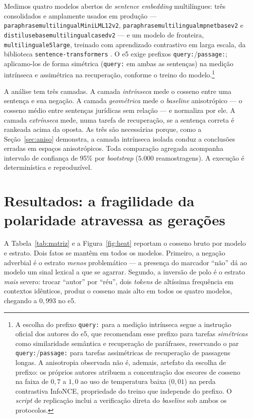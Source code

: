 \documentclass[11pt]{article}
\begin{document}
Medimos quatro modelos abertos de \textit{sentence embedding} multilíngues:
três consolidados e amplamente usados em produção --- \texttt{paraphrase\-multilingual\-MiniLM\-L12\-v2}, \texttt{paraphrase\-multilingual\-mpnet\-base\-v2} e
\texttt{distiluse\-base\-multilingual\-cased\-v2} --- e um modelo de fronteira,
\texttt{multilingual\-e5\-large}, treinado com aprendizado contrastivo em larga
escala, da biblioteca \texttt{sentence-transformers} \cite{reimers2019}. O e5
exige prefixos \texttt{query:}/\texttt{passage:}; aplicamo-los de forma simétrica
(\texttt{query:} em ambas as sentenças) na medição intrínseca e assimétrica na
recuperação, conforme o treino do modelo.\footnote{A escolha do prefixo
\texttt{query:} para a medição intrínseca segue a instrução oficial dos autores do
e5, que recomendam esse prefixo para tarefas \emph{simétricas} como similaridade
semântica e recuperação de paráfrases, reservando o par \texttt{query:}/\texttt{passage:}
para tarefas assimétricas de recuperação de passagens longas. A anisotropia
observada não é, ademais, artefato da escolha de prefixo: os próprios autores
atribuem a concentração dos escores de cosseno na faixa de $0{,}7$ a $1{,}0$ ao
uso de temperatura baixa ($0{,}01$) na perda contrastiva InfoNCE, propriedade do
treino que independe do prefixo. O \textit{script} de replicação inclui a
verificação direta do \textit{baseline} sob ambos os protocolos.}

A análise tem três camadas. A camada \emph{intrínseca} mede o cosseno entre uma
sentença e sua negação. A camada \emph{geométrica} mede o \textit{baseline}
anisotrópico --- o cosseno médio entre sentenças jurídicas sem relação --- e
normaliza por ele. A camada \emph{extrínseca} mede, numa tarefa de recuperação,
se a sentença correta é rankeada acima da oposta. As três são necessárias porque,
como a Seção~\ref{sec:aniso} demonstra, a camada intrínseca isolada conduz a
conclusões erradas em espaços anisotrópicos. Toda comparação agregada acompanha
intervalo de confiança de 95\% por \textit{bootstrap} ($5{.}000$ reamostragens). A
execução é determinística e reproduzível.

\section{Resultados: a fragilidade da polaridade atravessa as gerações}
\label{sec:resultados}

A Tabela~\ref{tab:matriz} e a Figura~\ref{fig:heat} reportam o cosseno bruto por
modelo e estrato. Dois fatos se mantêm em todos os modelos. Primeiro, a negação
adverbial é o estrato \emph{menos} problemático --- a presença do marcador ``não''
dá ao modelo um sinal lexical a que se agarrar. Segundo, a inversão de polo é o
estrato \emph{mais} severo: trocar ``autor'' por ``réu'', dois \textit{tokens} de
altíssima frequência em contextos idênticos, produz o cosseno mais alto em todos
os quatro modelos, chegando a $0{,}993$ no e5.
\end{document}
